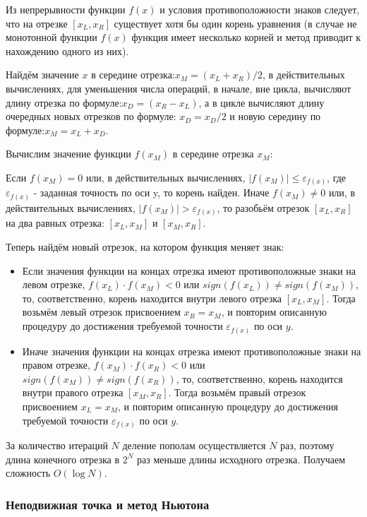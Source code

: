 Из непрерывности функции $f(x)$ и условия противоположности знаков следует, что на отрезке $[x_{L},x_{R}]$ существует хотя бы один корень уравнения (в случае не монотонной функции $f(x)$ функция имеет несколько корней и метод приводит к нахождению одного из них).

Найдём значение $x$ в середине отрезка:$x_{M}=(x_{L}+x_{R})/2$, в действительных вычислениях, для уменьшения числа операций, в начале, вне цикла, вычисляют длину отрезка по формуле:$x_{D}=(x_{R}-x_{L})$, а в цикле вычисляют длину очередных новых отрезков по формуле: $x_{D}=x_{D}/2$ и новую середину по формуле:$x_{M}=x_{L}+x_{D}$.

Вычислим значение функции $f(x_{M})$ в середине отрезка $x_M$:

Если $f(x_{M})=0$ или, в действительных вычислениях, $|f(x_{M})|\leq \varepsilon _{{f(x)}}$, где $\varepsilon _{{f(x)}}$ - заданная точность по оси y, то корень найден.
Иначе $f(x_{M})\neq 0$ или, в действительных вычислениях, $|f(x_{M})|>\varepsilon _{{f(x)}}$, то разобьём отрезок $[x_{L},x_{R}]$ на два равных отрезка: $[x_{L},x_{M}]$ и $[x_{M},x_{R}]$.

Теперь найдём новый отрезок, на котором функция меняет знак:

\begin{itemize}
	\item Если значения функции на концах отрезка имеют противоположные знаки на левом отрезке, $f(x_{L})\cdot f(x_{M})<0$ или $sign(f(x_{L}))\neq sign(f(x_{M}))$, то, соответственно, корень находится внутри левого отрезка $[x_{L},x_{M}]$. Тогда возьмём левый отрезок присвоением $x_{R}=x_{M}$, и повторим описанную процедуру до достижения требуемой точности $\varepsilon _{{f(x)}}$ по оси $y$.
	\item Иначе значения функции на концах отрезка имеют противоположные знаки на правом отрезке, $f(x_{M})\cdot f(x_{R})<0$ или $sign(f(x_{M}))\neq sign(f(x_{R}))$, то, соответственно, корень находится внутри правого отрезка $[x_{M},x_{R}]$. Тогда возьмём правый отрезок присвоением $x_{L}=x_{M}$, и повторим описанную процедуру до достижения требуемой точности $\varepsilon _{f(x)}$ по оси $y$.
\end{itemize}

За количество итераций $N$ деление пополам осуществляется $N$ раз, поэтому длина конечного отрезка в $2^N$ раз меньше длины исходного отрезка. Получаем сложность $O(\log N)$.

\subsubsection{Неподвижная точка и метод Ньютона}

